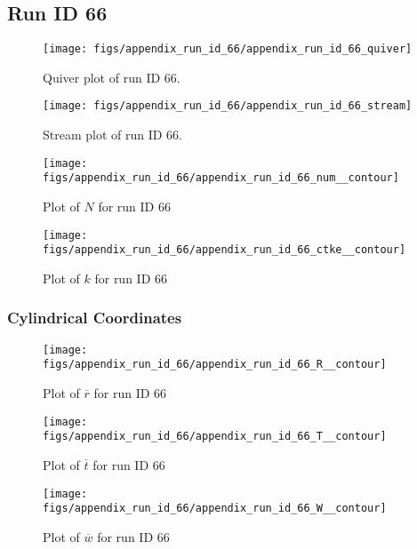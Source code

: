 \subsection{Run ID 66}
\begin{figure}[H]
\centering
\texttt{[image: figs/appendix\_run\_id\_66/appendix\_run\_id\_66\_quiver]}
\caption{Quiver plot of run ID 66.}
\label{fig:appendix_run_id_66_quiver}
\end{figure}


\begin{figure}[H]
\centering
\texttt{[image: figs/appendix\_run\_id\_66/appendix\_run\_id\_66\_stream]}
\caption{Stream plot of run ID 66.}
\label{fig:appendix_run_id_66_stream}
\end{figure}


\begin{figure}[H]
\centering
\texttt{[image: figs/appendix\_run\_id\_66/appendix\_run\_id\_66\_num\_\_contour]}
\caption{Plot of $N$ for run ID 66}
\label{fig:appendix_run_id_66_num__contour}
\end{figure}


\begin{figure}[H]
\centering
\texttt{[image: figs/appendix\_run\_id\_66/appendix\_run\_id\_66\_ctke\_\_contour]}
\caption{Plot of $k$ for run ID 66}
\label{fig:appendix_run_id_66_ctke__contour}
\end{figure}


\subsubsection{Cylindrical Coordinates}
\begin{figure}[H]
\centering
\texttt{[image: figs/appendix\_run\_id\_66/appendix\_run\_id\_66\_R\_\_contour]}
\caption{Plot of $\overline{r}$ for run ID 66}
\label{fig:appendix_run_id_66_R__contour}
\end{figure}


\begin{figure}[H]
\centering
\texttt{[image: figs/appendix\_run\_id\_66/appendix\_run\_id\_66\_T\_\_contour]}
\caption{Plot of $\overline{t}$ for run ID 66}
\label{fig:appendix_run_id_66_T__contour}
\end{figure}


\begin{figure}[H]
\centering
\texttt{[image: figs/appendix\_run\_id\_66/appendix\_run\_id\_66\_W\_\_contour]}
\caption{Plot of $\overline{w}$ for run ID 66}
\label{fig:appendix_run_id_66_W__contour}
\end{figure}


